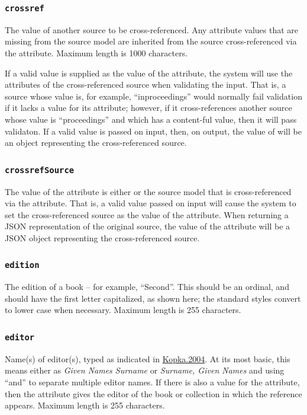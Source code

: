 \documentclass[letterpaper,10pt,english]{sphinxmanual}
\begin{document}
\subsubsection{\texttt{crossref}}
\label{datastructure:crossref}
The  value of another source to be cross-referenced. Any attribute values
that are missing from the source model are inherited from the source
cross-referenced via the  attribute.  Maximum length is 1000
characters.

If a valid  value is supplied as the value of the  attribute,
the system will use the attributes of the cross-referenced source when
validating the input.  That is, a source whose  value is, for example,
``inproceedings'' would normally fail validation if it lacks a value for its
 attribute; however, if it cross-references another source whose
 value is ``proceedings'' and which has a content-ful  value,
then it will pass validaton.  If a valid  value is passed on input,
then, on output, the value of  will be an object representing
the cross-referenced source.


\subsubsection{\texttt{crossrefSource}}
\label{datastructure:crossrefsource}
The value of the  attribute is either  or the source
model that is cross-referenced via the  attribute.  That is, a valid
 value passed on input will cause the system to set the
cross-referenced source as the value of the  attribute.  When
returning a JSON representation of the original source, the value of the
 attribute will be a JSON object representing the
cross-referenced source.


\subsubsection{\texttt{edition}}
\label{datastructure:edition}
The edition of a book -- for example, ``Second''. This should be an ordinal, and
should have the first letter capitalized, as shown here; the standard styles
convert to lower case when necessary.  Maximum length is 255 characters.


\subsubsection{\texttt{editor}}
\label{datastructure:editor}
Name(s) of editor(s), typed as indicated in {\hyperref[datastructure:kopka-2004]{Kopka.2004}}.  At its most basic,
this means either as \emph{Given Names Surname} or \emph{Surname, Given Names} and using
``and'' to separate multiple editor names.  If there is also a value for the
 attribute, then the  attribute gives the editor of the book
or collection in which the reference appears.  Maximum length is 255 characters.
\end{document}
